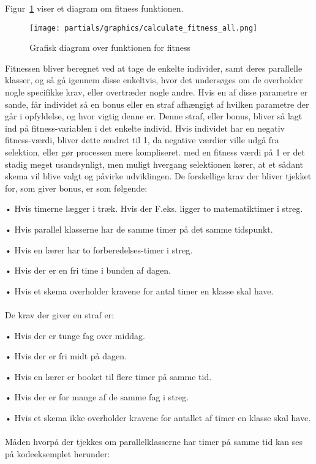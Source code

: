 Figur~\ref{fig:diagramfitness} viser et diagram om fitness funktionen.
\begin{figure}[!h]
\texttt{[image: partials/graphics/calculate\_fitness\_all.png]}
\caption{Grafisk diagram over funktionen for fitness}
\label{fig:diagramfitness}
\end{figure}

Fitnessen bliver beregnet ved at tage de enkelte individer, samt deres parallelle klasser, og så gå igennem disse enkeltvis, hvor det undersøges om de overholder nogle specifikke krav, eller overtræder nogle andre. Hvis en af disse parametre er sande, får individet så en bonus eller en straf afhængigt af hvilken parametre der går i opfyldelse, og hvor vigtig denne er. Denne straf, eller bonus, bliver så lagt ind på fitness-variablen i det enkelte individ. Hvis individet har en negativ fitness-værdi, bliver dette ændret til 1, da negative værdier ville udgå fra selektion, eller gør processen mere kompliseret. med en fitness værdi på 1 er det stadig meget usandsynligt, men muligt hvergang selektionen kører, at et sådant skema vil blive valgt og påvirke udviklingen.
De forskellige krav der bliver tjekket for, som giver bonus, er som følgende:

•	Hvis timerne lægger i træk. Hvis der F.eks. ligger to matematiktimer i streg.
   
•	Hvis parallel klasserne har de samme timer på det samme tidspunkt. 
   
•	Hvis en lærer har to forberedelses-timer i streg.
   
•	Hvis der er en fri time i bunden af dagen.
   
•	Hvis et skema overholder kravene for antal timer en klasse skal have.
\\\\   
De krav der giver en straf er:

•	Hvis der er tunge fag over middag.
   
•	Hvis der er fri midt på dagen.
   
•	Hvis en lærer er booket til flere timer på samme tid.
   
•	Hvis der er for mange af de samme fag i streg.
   
•	Hvis et skema ikke overholder kravene for antallet af timer en klasse skal have.
\\\\
Måden hvorpå der tjekkes om parallelklasserne har timer på samme tid kan ses på kodeeksemplet herunder:

